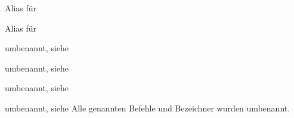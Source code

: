 \begin{Declaration}{}{%
  Alias für %
}
\begin{Declaration}{}{%
  Alias für %
}
\begin{Declaration}{}{umbenannt, siehe }
\begin{Declaration}{}{umbenannt, siehe }
\begin{Declaration}{}{umbenannt, siehe }
\begin{Declaration}{}{%
  umbenannt, siehe %
}
\printdeclarationlist*%
%
Alle genannten Befehle und Bezeichner wurden umbenannt.
\end{Declaration}
\end{Declaration}
\end{Declaration}
\end{Declaration}
\end{Declaration}
\end{Declaration}